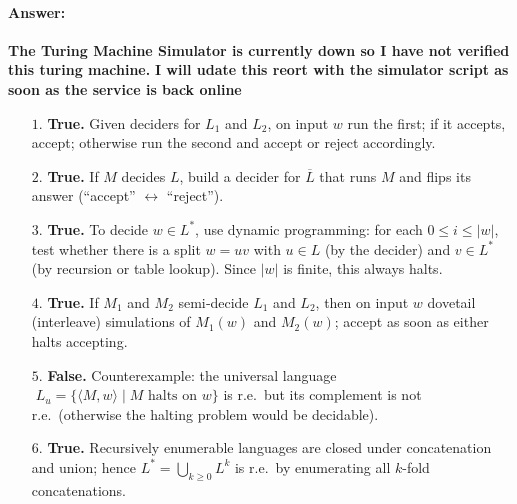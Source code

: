 \documentclass{article}
\begin{document}
\paragraph{Answer:}
\textbf{The Turing Machine Simulator is currently down so I have not verified this turing machine.}
\textbf{I will udate this reort with the simulator script as soon as the service is back online}
\begin{enumerate}
  \item[\(1.\)] \textbf{True.}  
    Given deciders for \(L_1\) and \(L_2\), on input \(w\) run the first; if it accepts, accept; otherwise run the second and accept or reject accordingly.  

  \item[\(2.\)] \textbf{True.}  
    If \(M\) decides \(L\), build a decider for \(\overline L\) that runs \(M\) and flips its answer (“accept” $\leftrightarrow$ “reject”).  

  \item[\(3.\)] \textbf{True.}  
    To decide \(w\in L^*\), use dynamic programming: for each \(0\le i\le |w|\), test whether there is a split \(w=uv\) with \(u\in L\) (by the decider) and \(v\in L^*\) (by recursion or table lookup).  Since \(|w|\) is finite, this always halts.  

  \item[\(4.\)] \textbf{True.}  
    If \(M_1\) and \(M_2\) semi‑decide \(L_1\) and \(L_2\), then on input \(w\) dovetail (interleave) simulations of \(M_1(w)\) and \(M_2(w)\); accept as soon as either halts accepting.  

  \item[\(5.\)] \textbf{False.}  
    Counterexample: the universal language  
    \(\;L_u=\{\langle M,w\rangle\mid M\text{ halts on }w\}\)  
    is r.e.\ but its complement is not r.e.\ (otherwise the halting problem would be decidable).  

  \item[\(6.\)] \textbf{True.}  
    Recursively enumerable languages are closed under concatenation and union; hence \(L^*=\bigcup_{k\ge0}L^k\) is r.e.\ by enumerating all \(k\)-fold concatenations.
\end{enumerate}
\end{document}
